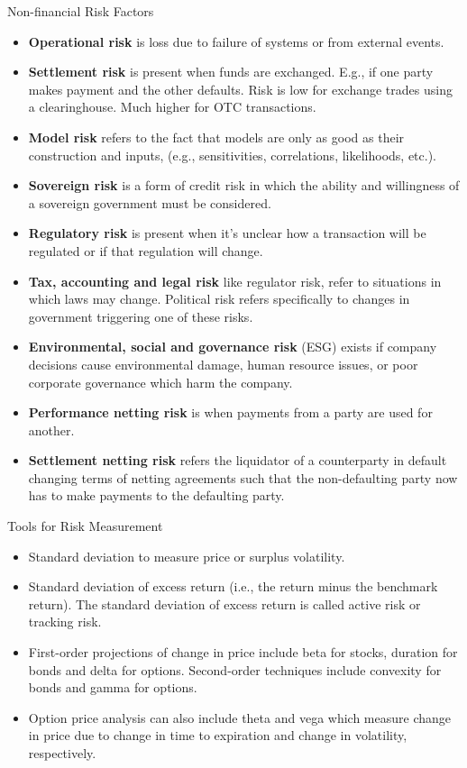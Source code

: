 \documentclass[../custom,grid]{flashcards}
\newcommand{\studyArea}{Risk Management}
\begin{document}
\begin{flashcard}[\studyArea]{Non-financial Risk Factors}
    \vspace{-3mm}
    \begin{itemize}[itemsep=.2\itemsep]
        \item \textbf{Operational risk} is loss due to failure of systems or from external events.
        \item \textbf{Settlement risk} is present when funds are exchanged. E.g., if one party makes payment and the other defaults. Risk is low for exchange trades using a clearinghouse. Much higher for OTC transactions.
        \item \textbf{Model risk} refers to the fact that models are only as good as their construction and inputs, (e.g., sensitivities, correlations, likelihoods, etc.).
        \item \textbf{Sovereign risk} is a form of credit risk in which the ability and willingness of a sovereign government must be considered.
        \item \textbf{Regulatory risk} is present when it's unclear how a transaction will be regulated or if that regulation will change.
        \item \textbf{Tax, accounting and legal risk} like regulator risk, refer to situations in which laws may change. Political risk refers specifically to changes in government triggering one of these risks.
        \item \textbf{Environmental, social and governance risk} (ESG) exists if company decisions cause environmental damage, human resource issues, or poor corporate governance which harm the company.
        \item \textbf{Performance netting risk} is when payments from a party are used for another.
        \item \textbf{Settlement netting risk} refers the liquidator of a counterparty in default changing terms of netting agreements such that the non-defaulting party now has to make payments to the defaulting party.
    \end{itemize}
\end{flashcard}

\begin{flashcard}[\studyArea]{Tools for Risk Measurement}
    \begin{itemize}
        \item Standard deviation to measure price or surplus volatility.
        \item Standard deviation of excess return (i.e., the return minus the benchmark return). The standard deviation of excess return is called active risk or tracking risk.
        \item First-order projections of change in price include beta for stocks, duration for bonds and delta for options. Second-order techniques include convexity for bonds and gamma for options.
        \item Option price analysis can also include theta and vega which measure change in price due to change in time to expiration and change in volatility, respectively.
    \end{itemize}
\end{flashcard}
\end{document}
